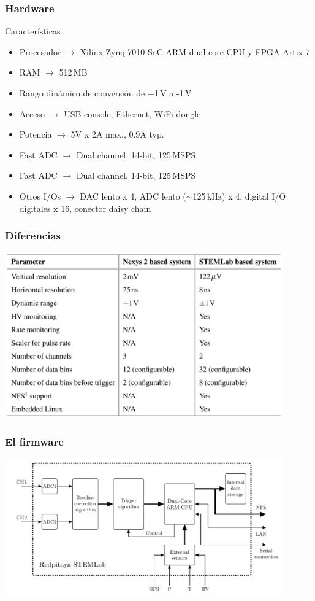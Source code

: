 \documentclass{beamer}
\begin{document}
\begin{frame}
	\frametitle{Hardware}
		\begin{exampleblock}{Características}
			\begin{itemize}
							\item Procesador $\to$ \alert{Xilinx Zynq-7010 SoC ARM dual core
											CPU y FPGA Artix 7}
				\item RAM $\to$ 512\,MB
				\item Rango dinámico de conversión de +1\,V a -1\,V
				\item Acceso $\to$ USB console, Ethernet, WiFi dongle
				\item Potencia $\to$ 5V x 2A max., 0.9A typ.
				\item Fast ADC $\to$ \alert{Dual channel, 14-bit, 125\,MSPS}
				\item Fast ADC $\to$ \alert{Dual channel, 14-bit, 125\,MSPS}
				\item Otros I/Os $\to$ DAC lento x 4, ADC lento ($\sim$125\,kHz) x 4,
								digital I/O digitales x 16, conector daisy chain 
			\end{itemize}
		\end{exampleblock}
\end{frame}

\begin{frame}
				\frametitle{Diferencias}
  \begin{block}{}
    \centering
    \includegraphics[width=0.9\textwidth]{diferencias_nexys_rp}
  \end{block}
\end{frame}

\begin{frame}
				\frametitle{El firmware}
  \begin{block}{}
    \centering
    \includegraphics[width=0.9\textwidth]{diag_sys}
  \end{block}
\end{frame}
\end{document}
